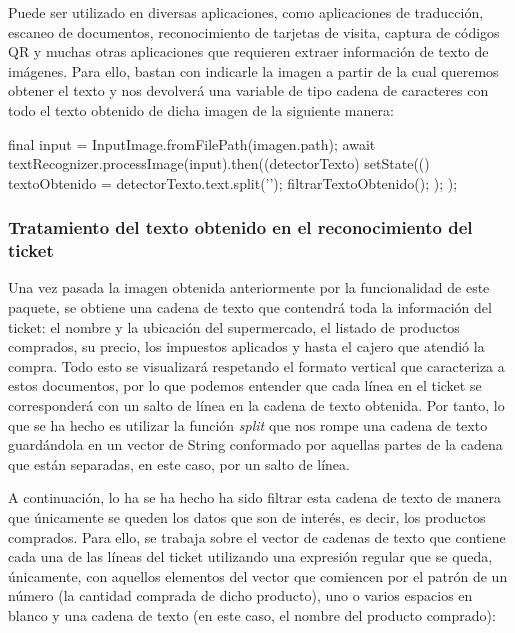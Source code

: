\documentclass{article}
\begin{document}
Puede ser utilizado en diversas aplicaciones, como aplicaciones de traducción, escaneo de documentos, reconocimiento de tarjetas de visita, captura de códigos QR y muchas otras aplicaciones que requieren extraer información de texto de imágenes. Para ello, bastan con indicarle la imagen a partir de la cual queremos obtener el texto y nos devolverá una variable de tipo cadena de caracteres con todo el texto obtenido de dicha imagen de la siguiente manera:

\vspace{0.5cm}
\begin{codigo}
final input = InputImage.fromFilePath(imagen.path);
await textRecognizer.processImage(input).then((detectorTexto) {
    setState(() {
        textoObtenido = detectorTexto.text.split('\n');
        filtrarTextoObtenido();
    });
});
\end{codigo}

\subsubsection{Tratamiento del texto obtenido en el reconocimiento del ticket}

Una vez pasada la imagen obtenida anteriormente por la funcionalidad de este paquete, se obtiene una cadena de texto que contendrá toda la información del ticket: el nombre y la ubicación del supermercado, el listado de productos comprados, su precio, los impuestos aplicados y hasta el cajero que atendió la compra. Todo esto se visualizará respetando el formato vertical que caracteriza a estos documentos, por lo que podemos entender que cada línea en el ticket se corresponderá con un salto de línea en la cadena de texto obtenida. Por tanto, lo que se ha hecho es utilizar la función \textit{split} que nos rompe una cadena de texto guardándola en un vector de String conformado por aquellas partes de la cadena que están separadas, en este caso, por un salto de línea.

A continuación, lo ha se ha hecho ha sido filtrar esta cadena de texto de manera que únicamente se queden los datos que son de interés, es decir, los productos comprados. Para ello, se trabaja sobre el vector de cadenas de texto que contiene cada una de las líneas del ticket utilizando una expresión regular que se queda, únicamente, con aquellos elementos del vector que comiencen por el patrón de un número (la cantidad comprada de dicho producto), uno o varios espacios en blanco y una cadena de texto (en este caso, el nombre del producto comprado):
\end{document}
